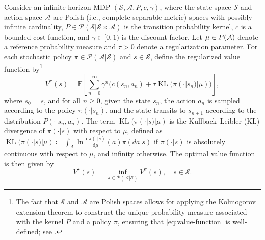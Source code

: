 \documentclass[11pt]{article}
\numberwithin{equation}{section}
\theoremstyle{definition}
\theoremstyle{remark}
\def\cA{\mathcal{A}}
\def\cP{\mathcal{P}}
\def\cS{\mathcal{S}}
\newcommand{\citet}{\cite}
\begin{document}
Consider an infinite horizon MDP $(\cS,\cA,P,c,\gamma)$,  
where the state space $\cS$ and action space $\cA$ are Polish (i.e., complete separable metric) spaces with possibly   infinite cardinality, $P\in \cP(\cS|\cS\times \cA)$ is the transition probability kernel, $c$ is a bounded cost function, and $\gamma\in [0,1)$ is the discount factor. 
Let $\mu \in \mathcal \cP(\cA)$ denote a reference probability measure and  $\tau>0$ denote a regularization parameter.   
For each  stochastic policy $\pi \in \cP(\cA|\cS)$ and $s\in \cS$, define the regularized value function by\footnote{The  fact that $\cS$ and $\cA$ are Polish spaces  allows for applying the Kolmogorov extension theorem to construct the unique probability measure associated with the kernel $P$ and a policy $\pi$,
ensuring that    \eqref{eq:value-function} is well-defined; see \citet[Section 2.1]{kerimkulov2023fisherrao}.} 
\begin{equation}
\label{eq:value-function}
V^{\pi}(s)= \mathbb E\left[\sum_{n=0}^\infty\gamma^n \Big(c(s_n,a_n) + \tau \operatorname{KL}(\pi(\cdot|s_n)|\mu)\Big)\right],
\end{equation}
where 
  $s_0=s$,
and for all $n\ge 0$, given the state $s_n$,
the action 
$a_n$ is sampled   according to the policy $\pi(\cdot|s_n)$, and the state  
transits to  $s_{n+1}$ according to the distribution  $P(\cdot|s_n,a_n)$.
The term 
$\operatorname{KL}(\pi(\cdot|s)|\mu) 
$ is the    Kullback--Leibler (KL) divergence  of $\pi(\cdot|s)$ with respect to $\mu$, defined as  
$
\operatorname{KL}(\pi(\cdot|s)|\mu)
\coloneqq \int_{A} \ln\frac{\mathrm{d} \pi(\cdot|s)}{\mathrm{d}\mu}(a) \pi(d a|s)  
$ if $\pi(\cdot |s)$ is absolutely continuous with respect to $\mu$,
and infinity otherwise.
 The optimal value function is then given by
\begin{equation*}
    \label{eq:V_star}
    V ^{\star}(s) = \inf_{\pi\in \cP(\cA|\cS)} V ^{\pi}(s), \quad s\in \cS.
\end{equation*}
\end{document}
